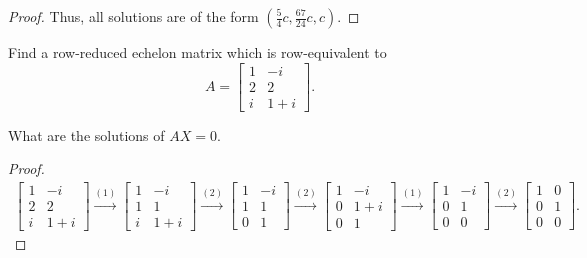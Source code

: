 \begin{proof}
    Thus, all solutions are of the form $(\frac{5}{4}c, \frac{67}{24}c, c)$.
\end{proof}

\begin{exercise}
    Find a row-reduced echelon matrix which is row-equivalent to
    \[
        A =
        \begin{bmatrix}
            1 & -i    \\
            2 & 2     \\
            i & 1 + i
        \end{bmatrix}.
    \]

    What are the solutions of $AX = 0$.
\end{exercise}

\begin{proof}
    \begingroup{}
    \allowdisplaybreaks{}
    \begin{align*}
        \begin{bmatrix}
            1   & -i{}    \\
            2   & 2       \\
            i{} & 1 + i{}
        \end{bmatrix}
        \stackrel{(1)}{\rightarrow}
        \begin{bmatrix}
            1   & -{i}    \\
            1   & 1       \\
            {i} & 1 + {i}
        \end{bmatrix}
        \stackrel{(2)}{\rightarrow}
        \begin{bmatrix}
            1 & -{i} \\
            1 & 1    \\
            0 & 1
        \end{bmatrix}
        \stackrel{(2)}{\rightarrow}
        \begin{bmatrix}
            1 & -{i}    \\
            0 & 1 + {i} \\
            0 & 1
        \end{bmatrix}
        \stackrel{(1)}{\rightarrow}
        \begin{bmatrix}
            1 & -{i} \\
            0 & 1    \\
            0 & 0
        \end{bmatrix}
        \stackrel{(2)}{\rightarrow}
        \begin{bmatrix}
            1 & 0 \\
            0 & 1 \\
            0 & 0
        \end{bmatrix}.
    \end{align*}
    \endgroup{}


\end{proof}
